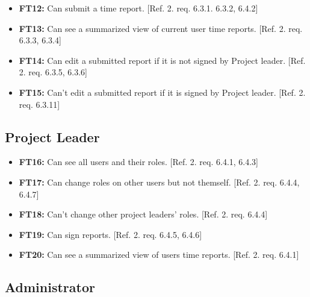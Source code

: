 \documentclass{article}
\begin{document}
		\begin{itemize}
  			\item \textbf{FT12:} Can submit a time report. [Ref. 2. req. 6.3.1. 6.3.2, 6.4.2]
  			
  			\item \textbf{FT13:} Can see a summarized view of current user time reports. [Ref. 2. req. 6.3.3, 6.3.4]
  			
  			\item \textbf{FT14:} Can edit a submitted report if it is not signed by Project leader. [Ref. 2. req. 6.3.5, 6.3.6]
  			
  			 \item \textbf{FT15:} Can't edit a submitted report if it is signed by Project leader. [Ref. 2. req. 6.3.11]


		\end{itemize}
		
		\subsection{Project Leader}
		
			\begin{itemize}
  			\item \textbf{FT16:} Can see all users and their roles. [Ref. 2. req. 6.4.1, 6.4.3]

  			\item \textbf{FT17:} Can change roles on other users but not themself. [Ref. 2. req. 6.4.4, 6.4.7]
  			
  			\item \textbf{FT18:} Can’t change other project leaders' roles. [Ref. 2. req. 6.4.4]
  			
  			\item \textbf{FT19:} Can sign reports. [Ref. 2. req. 6.4.5, 6.4.6]

  			\item \textbf{FT20:} Can see a summarized view of users time reports. [Ref. 2. req. 6.4.1]

		\end{itemize}
		
		\subsection{Administrator}
		
\end{document}
